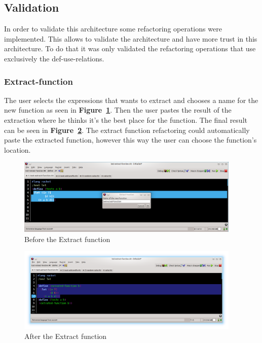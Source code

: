 \subsection{Validation}
In order to validate this architecture some refactoring operations were implemented. 
This allows to validate the architecture and have more trust in this architecture.
To do that it was only validated the refactoring operations that use exclusively the def-use-relations.

\subsubsection{Extract-function}
The user selects the expressions that wants to extract and chooses a name for the new function as seen in {\bf Figure~\ref{fig:extractBefore}}.
Then the user pastes the result of the extraction where he thinks it's the best place for the function. 
The final result can be seen in {\bf Figure~\ref{fig:extractAfter}}.
The extract function refactoring could automatically paste the extracted function, however this way the user can choose the function's location.
\begin{figure}[htbp]
	\centering
	\includegraphics[width=0.95\textwidth]{img/extract1.png}
	\caption{Before the Extract function}
	\label{fig:extractBefore}
\end{figure}

\begin{figure}[htbp]
	\centering
	\includegraphics[width=0.95\textwidth]{img/extract2.png}
	\caption{After the Extract function}
	\label{fig:extractAfter}
\end{figure}


